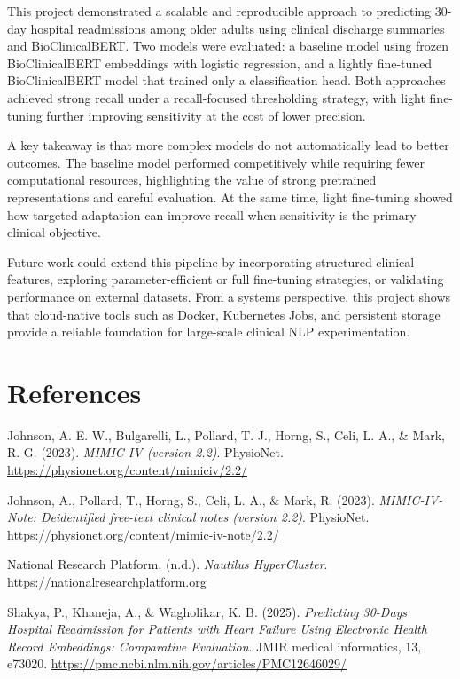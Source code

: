 \documentclass[11pt]{article}
\begin{document}
This project demonstrated a scalable and reproducible approach to predicting 30-day hospital readmissions among older adults using clinical discharge summaries and BioClinicalBERT. Two models were evaluated: a baseline model using frozen BioClinicalBERT embeddings with logistic regression, and a lightly fine-tuned BioClinicalBERT model that trained only a classification head. Both approaches achieved strong recall under a recall-focused thresholding strategy, with light fine-tuning further improving sensitivity at the cost of lower precision.

A key takeaway is that more complex models do not automatically lead to better outcomes. The baseline model performed competitively while requiring fewer computational resources, highlighting the value of strong pretrained representations and careful evaluation. At the same time, light fine-tuning showed how targeted adaptation can improve recall when sensitivity is the primary clinical objective.

Future work could extend this pipeline by incorporating structured clinical features, exploring parameter-efficient or full fine-tuning strategies, or validating performance on external datasets. From a systems perspective, this project shows that cloud-native tools such as Docker, Kubernetes Jobs, and persistent storage provide a reliable foundation for large-scale clinical NLP experimentation.

\clearpage
\section{References}

\noindent\hangindent=0.25in
Johnson, A. E. W., Bulgarelli, L., Pollard, T. J., Horng, S., Celi, L. A., \& Mark, R. G. (2023). \textit{MIMIC-IV (version 2.2)}. PhysioNet. \url{https://physionet.org/content/mimiciv/2.2/}

\vspace{0.6em}
\noindent\hangindent=0.25in
Johnson, A., Pollard, T., Horng, S., Celi, L. A., \& Mark, R. (2023). \textit{MIMIC-IV-Note: Deidentified free-text clinical notes (version 2.2)}. PhysioNet. \url{https://physionet.org/content/mimic-iv-note/2.2/}

\vspace{0.6em}
\noindent\hangindent=0.25in
National Research Platform. (n.d.). \textit{Nautilus HyperCluster}. \url{https://nationalresearchplatform.org}

\vspace{0.6em}
\noindent\hangindent=0.25in
Shakya, P., Khaneja, A., \& Wagholikar, K. B. (2025). \textit{Predicting 30-Days Hospital Readmission for Patients with Heart Failure Using Electronic Health Record Embeddings: Comparative Evaluation}. JMIR medical informatics, 13, e73020. \url{https://pmc.ncbi.nlm.nih.gov/articles/PMC12646029/}
\end{document}
